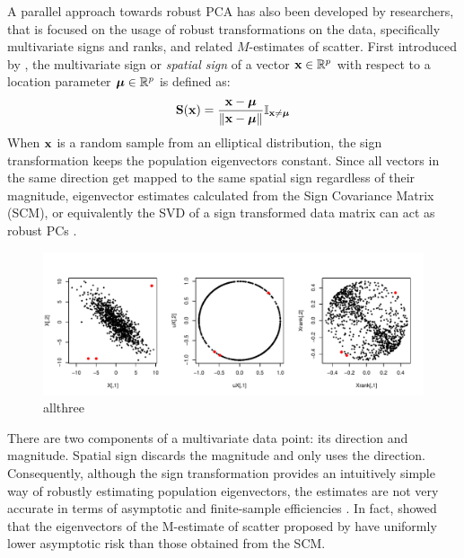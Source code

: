 A parallel approach towards robust PCA has also been developed by researchers, that is focused on the usage of robust transformations on the data, specifically multivariate signs and ranks, and related $M$-estimates of scatter. First introduced by \cite{MottonenOja95}, the multivariate sign or \textit{spatial sign} of a vector ${\bf{x}} \in {\mathbb{R}}^p$ with respect to a location parameter ${\boldsymbol{\mu}} \in {\mathbb{R}}^p$ is defined as:
%
$$
{\mathbf{S}} ({\bf{x}}) = \frac{{\bf{x}}  - {\boldsymbol{\mu}} }{\| {\bf{x}} - {\boldsymbol{\mu}}\|} {\mathbb{I}}_{{\bf{x}} \neq {\boldsymbol{\mu}}}
$$
%
When ${\bf{x}}$ is a random sample from an elliptical distribution, the sign transformation keeps the population eigenvectors constant. Since all vectors in the same direction get mapped to the same spatial sign regardless of their magnitude, eigenvector estimates calculated from the Sign Covariance Matrix (SCM), or equivalently the SVD of a sign transformed data matrix can act as robust PCs \citep{LocantoreEtal99,visuri00}.

\begin{figure}[t]
\centering
\includegraphics[width=\textwidth]{allthree}
\caption{allthree}
\label{fig1:allthree}
\end{figure}

There are two components of a multivariate data point: its direction and magnitude. Spatial sign discards the magnitude and only uses the direction. Consequently, although the sign transformation provides an intuitively simple way of robustly estimating population eigenvectors, the estimates are not very accurate in terms of asymptotic and finite-sample efficiencies \citep{Majumdar15}. In fact, \cite{magyar14} showed that the eigenvectors of the M-estimate of scatter proposed by \cite{tyler87} have uniformly lower asymptotic risk than those obtained from the SCM.

